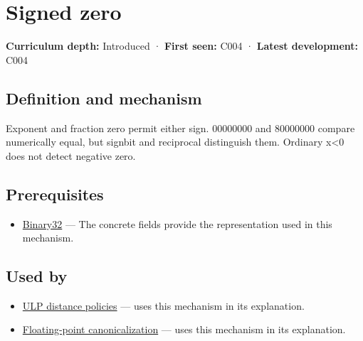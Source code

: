 \hypertarget{appendix-3a048f032c1f}{}\label{referencestart:appendix-3a048f032c1f}
\section{Signed zero}\label{appendix-3a048f032c1f-signed-zero}

\hypertarget{appendix-3a048f032c1f-signed-zero}{}

\textbf{Curriculum depth:} Introduced · \textbf{First seen:} C004 · \textbf{Latest development:} C004

\begin{allmightroledefinition}

\subsection{Definition and mechanism}\label{appendix-3a048f032c1f-definition-and-mechanism}

\hypertarget{appendix-3a048f032c1f-definition-and-mechanism}{}

Exponent and fraction zero permit either sign. 00000000 and 80000000 compare numerically equal, but signbit and reciprocal distinguish them. Ordinary x\textless0 does not detect negative zero.

\end{allmightroledefinition}

\subsection{Prerequisites}\label{appendix-3a048f032c1f-prerequisites}

\hypertarget{appendix-3a048f032c1f-prerequisites}{}

\begin{itemize}
\tightlist
\item
  \hyperref[appendix-5057f9ad327f]{Binary32} --- The concrete fields provide the representation used in this mechanism.
\end{itemize}

\subsection{Used by}\label{appendix-3a048f032c1f-used-by}

\hypertarget{appendix-3a048f032c1f-used-by}{}

\begin{itemize}
\tightlist
\item
  \hyperref[appendix-deca299ae4b8]{ULP distance policies} --- uses this mechanism in its explanation.
\item
  \hyperref[appendix-e90053a4b201]{Floating-point canonicalization} --- uses this mechanism in its explanation.
\end{itemize}

